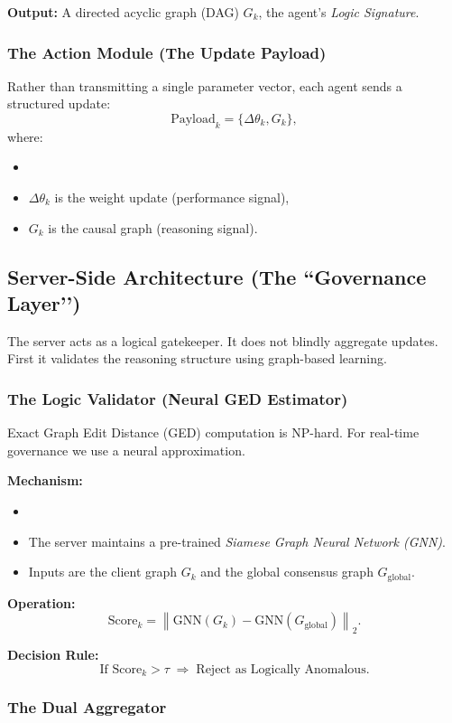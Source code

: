 \documentclass[journal]{IEEEtran}
\begin{document}
\textbf{Output:}
A directed acyclic graph (DAG) $G_k$, the agent’s \emph{Logic Signature}.

\subsubsection{The Action Module (The Update Payload)}

Rather than transmitting a single parameter vector, each agent sends a structured update:
\[
\text{Payload}_k = \{\Delta \theta_k, G_k\},
\]
where:
\begin{itemize}
\item  \item $\Delta \theta_k$ is the weight update (performance signal),
 \item $G_k$ is the causal graph (reasoning signal). \end{itemize}

\subsection{Server-Side Architecture (The ``Governance Layer’’)}

The server acts as a logical gatekeeper. It does not blindly aggregate updates. First it validates the reasoning structure using graph-based learning.

\subsubsection{The Logic Validator (Neural GED Estimator)}

Exact Graph Edit Distance (GED) computation is NP-hard. For real-time governance we use a neural approximation.

\textbf{Mechanism:}
\begin{itemize}
\item  \item The server maintains a pre-trained \emph{Siamese Graph Neural Network (GNN)}. \item Inputs are the client graph $G_k$ and the global consensus graph $G_{\text{global}}$. \end{itemize}

\textbf{Operation:}
\[
\text{Score}_k
=
\left\|
\text{GNN}(G_k) - \text{GNN}(G_{\text{global}})
\right\|_2. \]

\textbf{Decision Rule:}
\[
\text{If } \text{Score}_k > \tau \;\Rightarrow\; \text{Reject as Logically Anomalous}. \]

\subsubsection{The Dual Aggregator}
\end{document}
